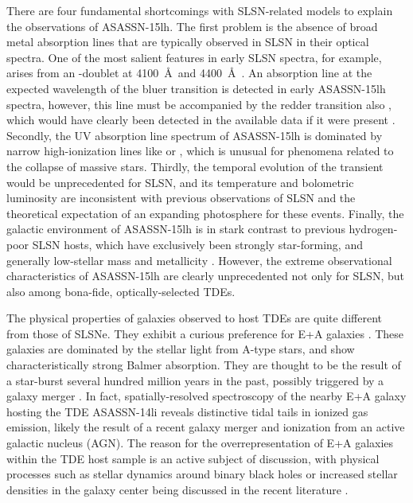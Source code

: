 \documentclass[traditabstract]{aa}
\begin{document}
There are four fundamental shortcomings with SLSN-related models to explain the observations of ASASSN-15lh. The first problem is the absence of broad metal absorption lines that are typically observed in SLSN in their optical spectra. One of the most salient features in early SLSN spectra, for example, arises from an -doublet at 4100~\AA~and 4400~\AA~\citep{2011Natur.474..487Q}. An absorption line at the expected wavelength of the bluer  transition is detected in early ASASSN-15lh spectra, however, this line must be accompanied by the redder transition also \citep{2016MNRAS.458.3455M}, which would have clearly been detected in the available data if it were present \citep{2016NatAs...1E...2L, 2017ApJ...836...25M}. Secondly, the UV absorption line spectrum of ASASSN-15lh is dominated by narrow high-ionization lines like  or , which is unusual for phenomena related to the collapse of massive stars. Thirdly, the temporal evolution of the transient would be unprecedented for SLSN, and its temperature and bolometric luminosity are inconsistent with previous observations of SLSN and the theoretical expectation of an expanding photosphere for these events. Finally, the galactic environment of ASASSN-15lh is in stark contrast to previous hydrogen-poor SLSN hosts, which have exclusively been strongly star-forming, and generally low-stellar mass and metallicity \citep[e.g.,][]{2015MNRAS.449..917L, 2016ApJ...830...13P, 2016arXiv160504925C}. However, the extreme observational characteristics of ASASSN-15lh are clearly unprecedented not only for SLSN, but also among bona-fide, optically-selected TDEs.

The physical properties of galaxies observed to host TDEs are quite different from those of SLSNe. They exhibit a curious preference  \citep{2014ApJ...793...38A, 2016ApJ...818L..21F, 2017arXiv170702986G, 2017arXiv170701559L} for E+A galaxies \citep{1996ApJ...466..104Z}. These galaxies are dominated by the stellar light from A-type stars, and show characteristically strong Balmer absorption. They are thought to be the result of a star-burst several hundred million years in the past, possibly triggered by a galaxy merger \citep{1996ApJ...466..104Z}. In fact, spatially-resolved spectroscopy of the nearby E+A galaxy hosting the TDE ASASSN-14li \citep{2016ApJ...830L..32P} reveals distinctive tidal tails in ionized gas emission, likely the result of a recent galaxy merger and ionization from an active galactic nucleus (AGN). The reason for the overrepresentation of E+A galaxies within the TDE host sample is an active subject of discussion, with physical processes such as stellar dynamics around binary black holes or increased stellar densities in the galaxy center being discussed in the recent literature \citep[e.g.,][]{2016ApJ...825L..14S, 2017ApJ...835..176F}.
\end{document}
